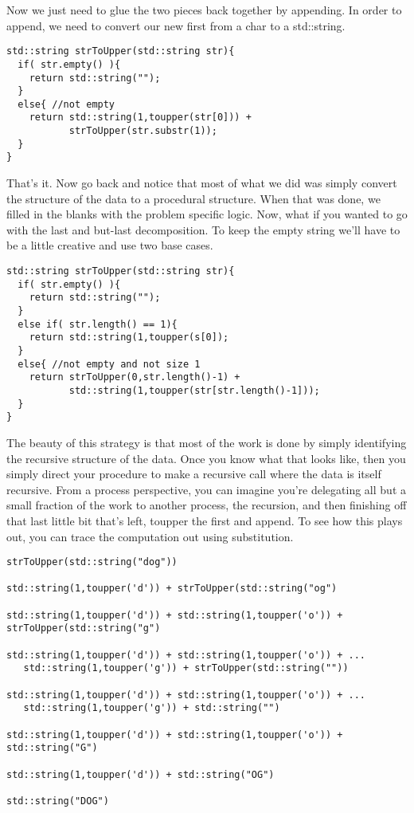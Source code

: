 \documentclass[]{tufte-handout}
\begin{document}
Now we just need to glue the two pieces back together by appending. In order to append, we need to convert our new first from a char to a std::string.
\begin{verbatim}
std::string strToUpper(std::string str){
  if( str.empty() ){
    return std::string("");
  }
  else{ //not empty
    return std::string(1,toupper(str[0])) +
           strToUpper(str.substr(1));
  }
}
\end{verbatim}

That's it.  Now go back and notice that most of what we did was simply convert the structure of the data to a procedural structure. When that was done, we filled in the blanks with the problem specific logic. Now, what if you wanted to go with the last and but-last decomposition. To keep the empty string we'll have to be a little creative and use two base cases.
\begin{verbatim}
std::string strToUpper(std::string str){
  if( str.empty() ){
    return std::string("");
  }
  else if( str.length() == 1){
    return std::string(1,toupper(s[0]);
  }
  else{ //not empty and not size 1
    return strToUpper(0,str.length()-1) + 
           std::string(1,toupper(str[str.length()-1]));           
  }
}
\end{verbatim}

The beauty of this strategy is that most of the work is done by simply identifying the recursive structure of the data. Once you know what that looks like, then you simply direct your procedure to make a recursive call where the data is itself recursive. From a process perspective, you can imagine you're delegating all but a small fraction of the work to another process, the recursion, and then finishing off that last little bit that's left, toupper the first and append. To see how this plays out, you can trace the computation out using substitution.
\begin{verbatim}
strToUpper(std::string("dog"))

std::string(1,toupper('d')) + strToUpper(std::string("og")

std::string(1,toupper('d')) + std::string(1,toupper('o')) + strToUpper(std::string("g")

std::string(1,toupper('d')) + std::string(1,toupper('o')) + ...
   std::string(1,toupper('g')) + strToUpper(std::string(""))

std::string(1,toupper('d')) + std::string(1,toupper('o')) + ...
   std::string(1,toupper('g')) + std::string("")

std::string(1,toupper('d')) + std::string(1,toupper('o')) + std::string("G")

std::string(1,toupper('d')) + std::string("OG")

std::string("DOG")
\end{verbatim} 
\end{document}
